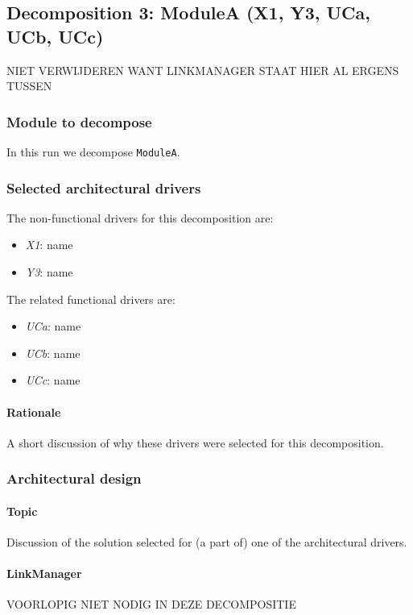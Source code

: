 \documentclass[a4paper,10pt]{article}
\begin{document}
\subsection{Decomposition 3: ModuleA (X1, Y3, UCa, UCb, UCc)} NIET VERWIJDEREN WANT LINKMANAGER STAAT HIER AL ERGENS TUSSEN
\subsubsection{Module to decompose}
In this run we decompose \texttt{ModuleA}.

\subsubsection{Selected architectural drivers}
The non-functional drivers for this decomposition are:

\begin{itemize}
    \item \emph{X1}: name
    \item \emph{Y3}: name
\end{itemize}

The related functional drivers are:

\begin{itemize}
    \item \emph{UCa}: name
    \item \emph{UCb}: name
    \item \emph{UCc}: name
\end{itemize}

\paragraph{Rationale}
A short discussion of why these drivers were selected for this decomposition.

\subsubsection{Architectural design}
\paragraph{Topic}
Discussion of the solution selected for (a part of) one of the architectural
drivers.
\paragraph{LinkManager} VOORLOPIG NIET NODIG IN DEZE DECOMPOSITIE
\end{document}
